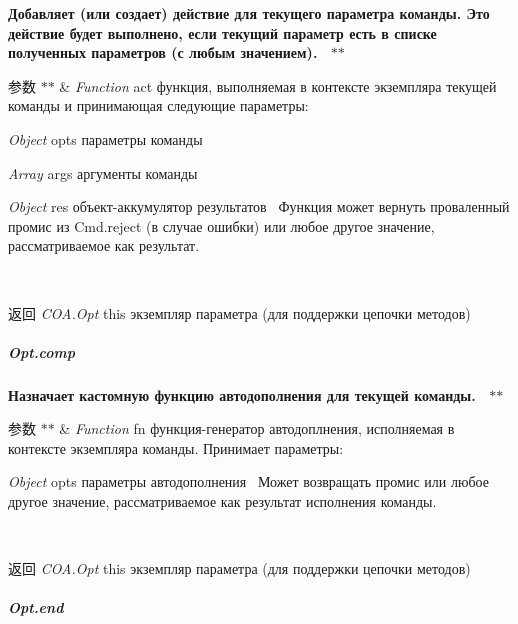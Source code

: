 {\bfseries {\bfseries {\bfseries {\bfseries {\bfseries {\bfseries  Добавляет (или создает) действие для текущего параметра команды. Это действие будет выполнено, если текущий параметр есть в списке полученных параметров (с любым значением).~\newline
 $\ast$$\ast$
\begin{DoxyParams}{参数}
{\em $\ast$$\ast$} & {\itshape Function} {\ttfamily act} функция, выполняемая в контексте экземпляра текущей команды и принимающая следующие параметры\+:~\newline

\begin{DoxyItemize}
\item {\itshape Object} {\ttfamily opts} параметры команды~\newline

\item {\itshape Array} {\ttfamily args} аргументы команды~\newline

\item {\itshape Object} {\ttfamily res} объект-\/аккумулятор результатов~\newline
 Функция может вернуть проваленный промис из Cmd.\+reject (в случае ошибки) или любое другое значение, рассматриваемое как результат.~\newline
 {\bfseries }
\end{DoxyItemize}\\
\hline
\end{DoxyParams}
\begin{DoxyReturn}{返回}
{\bfseries } {\itshape C\+O\+A.\+Opt} {\ttfamily this} экземпляр параметра (для поддержки цепочки методов)
\end{DoxyReturn}
\subparagraph*{Opt.\+comp}}}}}}}

{\bfseries {\bfseries {\bfseries {\bfseries {\bfseries {\bfseries  Назначает кастомную функцию автодополнения для текущей команды.~\newline
 $\ast$$\ast$
\begin{DoxyParams}{参数}
{\em $\ast$$\ast$} & {\itshape Function} {\ttfamily fn} функция-\/генератор автодоплнения, исполняемая в контексте экземпляра команды. Принимает параметры\+:~\newline

\begin{DoxyItemize}
\item {\itshape Object} {\ttfamily opts} параметры автодополнения~\newline
 Может возвращать промис или любое другое значение, рассматриваемое как результат исполнения команды.~\newline
 {\bfseries }
\end{DoxyItemize}\\
\hline
\end{DoxyParams}
\begin{DoxyReturn}{返回}
{\bfseries } {\itshape C\+O\+A.\+Opt} {\ttfamily this} экземпляр параметра (для поддержки цепочки методов)
\end{DoxyReturn}
\subparagraph*{Opt.\+end}}}}}}}

